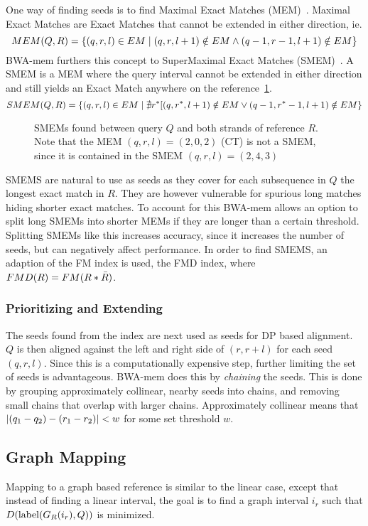 One way of finding seeds is to find Maximal Exact Matches (MEM)~\cite{longmem, origmem}.
Maximal Exact Matches are Exact Matches that cannot be extended in either direction, ie. 
\[
  MEM(Q, R) = \left\{(q, r, l) \in EM \mid (q, r, l+1) \notin EM \wedge (q-1, r-1, l+1) \notin EM\right\}
\]
BWA-mem furthers this concept to SuperMaximal Exact Matches (SMEM)~\cite{origsmem}.
A SMEM is a MEM where the query interval cannot be extended in either direction and still yields an Exact Match anywhere on the reference~\ref{fig:smem}.
\[
  SMEM(Q, R) = \left\{(q, r, l) \in EM \mid \nexists r^*[(q, r^*, l+1) \notin EM \vee (q-1, r^*-1, l+1) \notin EM\right\}
\]
\begin{figure}
  \tikzpicture
  
  \endtikzpicture
  \label{fig:smem}
  \caption{SMEMs found between query $Q$ and both strands of reference $R$. Note that the MEM $(q, r, l)=(2, 0, 2)$ (CT) is not a SMEM, since it is contained in the SMEM $(q, r, l) = (2, 4, 3)$}
\end{figure}

SMEMS are natural to use as seeds as they cover for each subsequence in $Q$ the longest exact match in $R$.
They are however vulnerable for spurious long matches hiding shorter exact matches.
To account for this BWA-mem allows an option to split long SMEMs into shorter MEMs if they are longer than a certain threshold.
Splitting SMEMs like this increases accuracy, since it increases the number of seeds, but can negatively affect performance. 
In order to find SMEMS, an adaption of the FM index is used, the FMD index, where $FMD(R) = FM(R * \bar{R})$.

\subsubsection{Prioritizing and Extending}
The seeds found from the index are next used as seeds for DP based alignment.
$Q$ is then aligned against the left and right side of $(r, r+l)$ for each seed $(q, r, l)$.
Since this is a computationally expensive step, further limiting the set of seeds is advantageous.
BWA-mem does this by \emph{chaining} the seeds.
This is done by grouping approximately collinear, nearby seeds into chains, and removing small chains that overlap with larger chains.
Approximately collinear means that $\left | (q_1-q_2) -(r_1-r_2) \right |<w$ for some set threshold $w$.

\subsection{Graph Mapping}
Mapping to a graph based reference is similar to the linear case, except that instead of finding a linear interval, the goal is to find a graph interval $i_r$ such that $D(\text{label}(G_R(i_r), Q))$ is minimized. 

